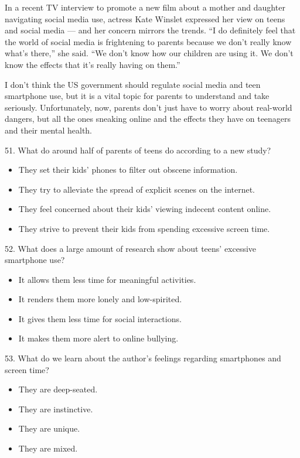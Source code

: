 \documentclass[UTF8,11pt]{ctexart}
\begin{document}
In a recent TV interview to promote a new film about a mother and daughter navigating social media use, actress Kate Winslet expressed her view on teens and social media — and her concern mirrors the trends. “I do definitely feel that the world of social media is frightening to parents because we don’t really know what’s there,” she said. “We don’t know how our children are using it. We don’t know the effects that it’s really having on them.”


I don’t think the US government should regulate social media and teen smartphone use, but it is a vital topic for parents to understand and take seriously. Unfortunately, now, parents don’t just have to worry about real-world dangers, but all the ones sneaking online and the effects they have on teenagers and their mental health.


51. What do around half of parents of teens do according to a new study?


\begin{itemize}[leftmargin=2em,itemsep=.2em,topsep=.4em]\item[A.] They set their kids’ phones to filter out obscene information.
\item[B.] They try to alleviate the spread of explicit scenes on the internet.
\item[C.] They feel concerned about their kids’ viewing indecent content online.
\item[D.] They strive to prevent their kids from spending excessive screen time.
\end{itemize}

52. What does a large amount of research show about teens’ excessive smartphone use?


\begin{itemize}[leftmargin=2em,itemsep=.2em,topsep=.4em]\item[A.] It allows them less time for meaningful activities.
\item[B.] It renders them more lonely and low-spirited.
\item[C.] It gives them less time for social interactions.
\item[D.] It makes them more alert to online bullying.
\end{itemize}

53. What do we learn about the author’s feelings regarding smartphones and screen time?


\begin{itemize}[leftmargin=2em,itemsep=.2em,topsep=.4em]\item[A.] They are deep-seated.
\item[B.] They are instinctive.
\item[C.] They are unique.
\item[D.] They are mixed.
\end{itemize}
\end{document}
